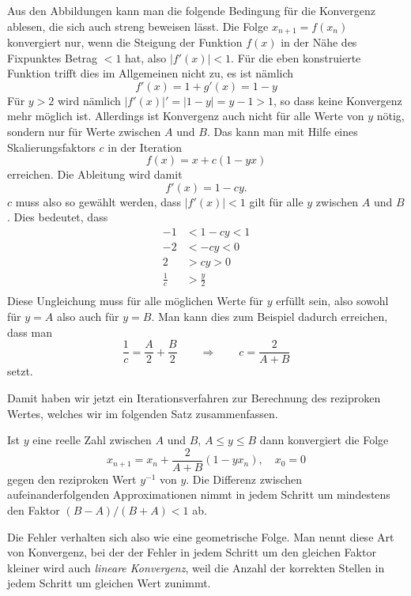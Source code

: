 Aus den Abbildungen kann man die folgende Bedingung für die Konvergenz
ablesen, die sich auch streng beweisen lässt.
Die Folge $x_{n+1} = f(x_n)$ konvergiert nur, wenn die Steigung
der Funktion $f(x)$ in der Nähe des Fixpunktes Betrag $<1$ hat, 
also $|f'(x)|<1$.
Für die eben konstruierte Funktion trifft dies im Allgemeinen nicht zu,
es ist nämlich
\[
f'(x) = 1 + g'(x) = 1 - y
\]
Für $y>2$ wird nämlich $|f'(x)|'=|1-y| = y-1 >1$, so dass keine Konvergenz
mehr möglich ist.
Allerdings ist Konvergenz auch nicht für alle Werte von $y$ nötig, sondern
nur für Werte zwischen $A$ und $B$.
Das kann man mit Hilfe eines Skalierungsfaktors $c$ in der Iteration
\[
f(x) = x + c(1-yx)
\]
erreichen.
Die Ableitung wird damit
\[
f'(x) = 1-cy.
\]
$c$  muss also so gewählt werden, dass $|f'(x)|<1$ gilt für alle $y$
zwischen $A$ und $B$.
Dies bedeutet, dass
\begin{align*}
-1 &< 1-cy < 1 \\
-2 &< -cy < 0 \\
2 &> cy > 0 \\
\frac1c &> \frac{y}2 \\
\end{align*}
Diese Ungleichung muss für alle möglichen Werte für $y$ erfüllt sein,
also sowohl für $y=A$ also auch für $y=B$.
Man kann dies zum Beispiel dadurch erreichen, dass man
\[
\frac1c = \frac{A}2 + \frac{B}2
\qquad\Rightarrow\qquad
c = \frac{2}{A+B}
\]
setzt.

Damit haben wir jetzt ein Iterationsverfahren zur Berechnung des 
reziproken Wertes, welches wir im folgenden Satz zusammenfassen.

\begin{satz}
\label{satz:reziprok}
Ist $y$ eine reelle Zahl zwischen $A$ und $B$, $A\le y\le B$ dann
konvergiert die Folge
\[
x_{n+1} = x_n + \frac{2}{A+B}(1-yx_n), \quad x_0 = 0
\]
gegen den reziproken Wert $y^{-1}$ von $y$.
Die Differenz zwischen aufeinanderfolgenden Approximationen nimmt
in jedem Schritt um mindestens den Faktor $(B-A)/(B+A)<1$ ab.
\end{satz}

Die Fehler verhalten sich also wie eine geometrische Folge.
%
Man nennt diese Art von Konvergenz, bei der der Fehler in jedem
Schritt um den gleichen Faktor kleiner wird auch {\em lineare Konvergenz},
%
weil die Anzahl der korrekten Stellen in jedem Schritt um gleichen
Wert zunimmt.

